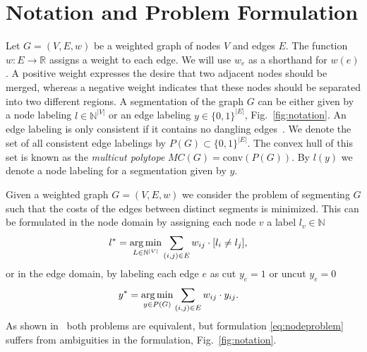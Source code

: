 \section{Notation and Problem Formulation}\label{sec:problem_formulation}
Let $G=(V,E, w)$ be a weighted graph of nodes $V$ and edges $E$.
%
The function $w : E \rightarrow \mathbb{R}$ assigns a weight to each edge.
We will use $w_e$ as a shorthand for $w(e)$.
A positive weight expresses the desire that two adjacent nodes should
be merged, whereas a negative weight indicates
that these nodes should be separated into two different regions.
%
%
%
A segmentation of the graph $G$ can be either given by a
node labeling $l \in \mathbb{N}^{|V|}$
or an edge labeling $y \in\{0,1\}^{|E|}$, \cf Fig.~\ref{fig:notation}.
An edge labeling is only consistent if it contains no dangling edges~\cite{kappes_2013_arxiv}.
We denote the set of all consistent edge labelings by $P(G)\subset\{0,1\}^{|E|}$.
The convex hull of this set is known as the \emph{multicut polytope} $MC(G) = \textrm{conv}(P(G))$.
%
By $l(y)$ we denote a node labeling for a segmentation given by $y$.

Given a weighted graph $G=(V,E,w)$ we consider the problem of segmenting $G$ such that the costs
of the edges between distinct segments is minimized. This can be formulated in the node domain
by assigning each node $v$ a label $l_v \in \mathbb{N}$
\begin{align}
  l^* &= \operatorname*{arg\,min}_{L \in \mathbb{N}^{|V|}} \sum_{ (i,j) \in E } w_{ij} \cdot [l_{i} \neq l_{j}], \label{eq:nodeproblem}
\end{align} 
or in the edge domain, by labeling each edge $e$ as cut $y_e=1$ or uncut $y_e=0$ 
\begin{align}
  y^* &= \argmin_{y \in P(G)} \sum_{ (i,j) \in E } w_{ij} \cdot y_{ij} \label{eq:edgeproblem}.%
\end{align}
As shown in~\cite{kappes_2013_arxiv}  both problems are equivalent, but formulation \ref{eq:nodeproblem}
suffers from ambiguities in the formulation, \cf Fig.~\ref{fig:notation}. 

%
